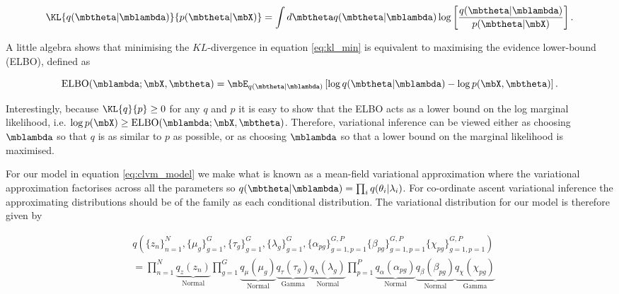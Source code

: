 \begin{equation}
  \KL{q(\mbtheta | \mblambda)}{p(\mbtheta | \mbX)} =
  \int d\mbtheta q(\mbtheta | \mblambda) \log\left[ \frac{q(\mbtheta | \mblambda)}{p(\mbtheta | \mbX)}\right].
\label{eq:kl_min}
\end{equation}

A little algebra shows that minimising the $KL$-divergence in equation \ref{eq:kl_min} is equivalent to maximising the evidence lower-bound (ELBO), defined as

\begin{equation}
  \text{ELBO}(\mblambda; \mbX, \mbtheta) = \mbE_{q(\mbtheta | \mblambda)} \left[
\log q(\mbtheta | \mblambda) - \log p(\mbX, \mbtheta)
  \right].
\end{equation}

Interestingly, because $\KL{q}{p} \geq 0$ for any $q$ and $p$ it is easy to show that the ELBO acts as a lower bound on the log marginal likelihood, i.e. $\log p(\mbX) \geq \text{ELBO}(\mblambda; \mbX, \mbtheta)$. Therefore, variational inference can be viewed either as choosing $\mblambda$ so that $q$ is as similar to $p$ as possible, or as choosing $\mblambda$ so that a lower bound on the marginal likelihood is maximised.

For our model in equation \ref{eq:clvm_model} we make what is known as a mean-field variational approximation where the variational approximation factorises across all the parameters so $q(\mbtheta | \mblambda) = \prod_i q(\theta_i | \lambda_i)$. For co-ordinate ascent variational inference the approximating distributions should be of the family as each conditional distribution. The variational distribution for our model is therefore given by

\begin{equation}
\begin{aligned}
& q\left(
\{ z_n \}_{n=1}^N,
\{ \mu_g \}_{g=1}^G,
\{ \tau_g \}_{g=1}^G,
\{ \lambda_g \}_{g=1}^G,
\{ \alpha_{pg} \}_{g=1,p=1}^{G,P}
\{ \beta_{pg} \}_{g=1,p=1}^{G,P}
\{ \chi_{pg} \}_{g=1,p=1}^{G,P}
\right) \\
& = \prod_{n=1}^N \underbrace{q_z(z_n)}_{\text{Normal}}
\prod_{g=1}^G \underbrace{q_\mu(\mu_g)}_{\text{Normal}}
\underbrace{q_\tau(\tau_g)}_{\text{Gamma}} \underbrace{q_\lambda(\lambda_g)}_{\text{Normal}}
\prod_{p=1}^P \underbrace{q_\alpha (\alpha_{pg})}_{\text{Normal}}
\underbrace{q_\beta(\beta_{pg})}_{\text{Normal}} \underbrace{q_\chi (\chi_{pg})}_{\text{Gamma}}
\end{aligned} \label{eq:variational}
\end{equation}

